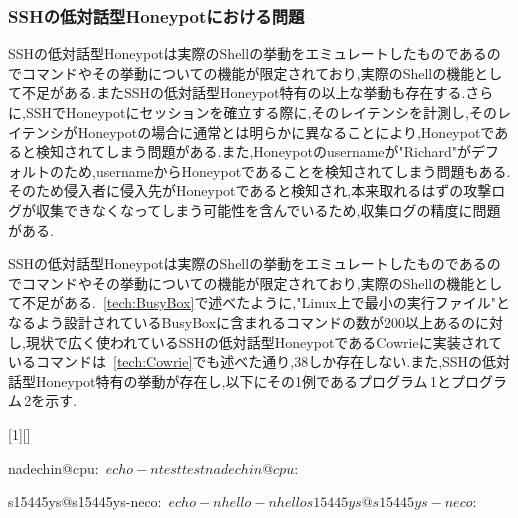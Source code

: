 \subsubsection{SSHの低対話型Honeypotにおける問題}
\label{appr:problemofSshLowHoneypot}
SSHの低対話型Honeypotは実際のShellの挙動をエミュレートしたものであるのでコマンドやその挙動についての機能が限定されており,実際のShellの機能として不足がある.またSSHの低対話型Honeypot特有の以上な挙動も存在する.さらに,SSHでHoneypotにセッションを確立する際に,そのレイテンシを計測し,そのレイテンシがHoneypotの場合に通常とは明らかに異なることにより,Honeypotであると検知されてしまう問題がある.また,Honeypotのusernameが"Richard"がデフォルトのため,usernameからHoneypotであることを検知されてしまう問題もある.そのため侵入者に侵入先がHoneypotであると検知され,本来取れるはずの攻撃ログが収集できなくなってしまう可能性を含んでいるため,収集ログの精度に問題がある.

\label{appr:LowHoneypotLatency}

\label{appr:LowHoneypotUsername}

\label{appr:LowHoneypotCommand}
SSHの低対話型Honeypotは実際のShellの挙動をエミュレートしたものであるのでコマンドやその挙動についての機能が限定されており,実際のShellの機能として不足がある.~\ref{tech:BusyBox}で述べたように,"Linux上で最小の実行ファイル"となるよう設計されているBusyBoxに含まれるコマンドの数が200以上あるのに対し,現状で広く使われているSSHの低対話型HoneypotであるCowrieに実装されているコマンドは~\ref{tech:Cowrie}でも述べた通り,38しか存在しない.また,SSHの低対話型Honeypot特有の挙動が存在し,以下にその1例であるプログラム\,1とプログラム\,2を示す.

\vspace{5mm}
[1][]
    {\lstset{
        frame=single,
        basicstyle=\ttfamily,
        numbers=left,
        numbersep=10pt,
        tabsize=2,
        extendedchars=true,
        xleftmargin=17pt,
        framexleftmargin=17pt,
        #1
    }
}{}

\begin{mylisting}[language=sh,caption=正しいShellの挙動]
nadechin@cpu:~$ echo -n test
testnadechin@cpu:~$
\end{mylisting}

\begin{mylisting}[language=sh,caption=Kippo特有の異常な挙動の例]
s15445ys@s15445ys-neco:~$ echo -n hello
-n hello
s15445ys@s15445ys-neco:~$
\end{mylisting}


